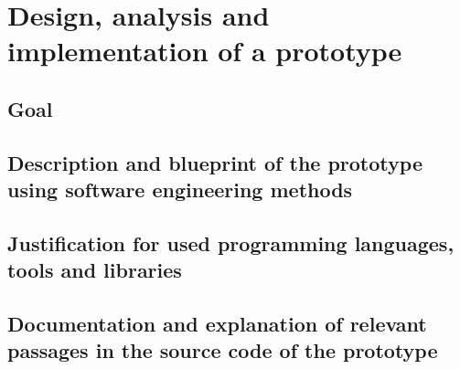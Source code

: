 \chapter{Design, analysis and implementation of a prototype}
\label{chapter:prototype}

\section{Goal}

\section{Description and blueprint of the prototype using software engineering
methods}

\section{Justification for used programming languages, tools and libraries}

\section{Documentation and explanation of relevant passages in the source code of the prototype}

